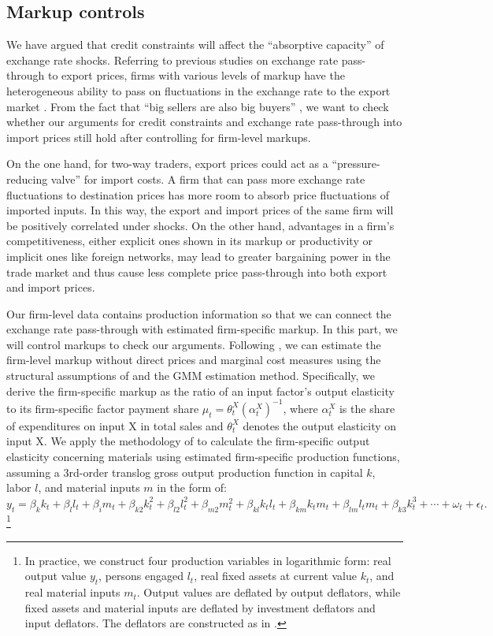 \subsection{Markup controls}

We have argued that credit constraints will affect the ``absorptive capacity'' of exchange rate shocks. Referring to previous studies on exchange rate pass-through to export prices, firms with various levels of markup have the heterogeneous ability to pass on fluctuations in the exchange rate to the export market \citep{aik2019}. From the fact that ``big sellers are also big buyers'' \citep{aik2014}, we want to check whether our arguments for credit constraints and exchange rate pass-through into import prices still hold after controlling for firm-level markups.

On the one hand, for two-way traders, export prices could act as a ``pressure-reducing valve'' for import costs. A firm that can pass more exchange rate fluctuations to destination prices has more room to absorb price fluctuations of imported inputs. In this way, the export and import prices of the same firm will be positively correlated under shocks. On the other hand, advantages in a firm's competitiveness, either explicit ones shown in its markup or productivity or implicit ones like foreign networks, may lead to greater bargaining power in the trade market and thus cause less complete price pass-through into both export and import prices.

Our firm-level data contains production information so that we can connect the exchange rate pass-through with estimated firm-specific markup. In this part, we will control markups to check our arguments. Following \cite{bkl2021}, we can estimate the firm-level markup without direct prices and marginal cost measures using the structural assumptions of \cite{dlw2012} and the GMM estimation method. Specifically, we derive the firm-specific markup as the ratio of an input factor's output elasticity to its firm-specific factor payment share $\mu_{t}=\theta_{t}^{X}\left(\alpha_{t}^{X}\right)^{-1}$, where $\alpha_{t}^{X}$ is the share of expenditures on input X in total sales and $\theta^X_t$ denotes the output elasticity on input X. We apply the methodology of \cite{acf2015} to calculate the firm-specific output elasticity concerning materials using estimated firm-specific production functions, assuming a 3rd-order translog gross output production function in capital $k$, labor $l$, and material inputs $m$ in the form of: $ y_{t}= \beta_{k} k_{t}+\beta_{l} l_{t}+\beta_{i} m_{t}+\beta_{k 2} k_{t}^{2}+\beta_{l 2} l_{t}^{2}+\beta_{m 2} m_{t}^{2}+ \beta_{k l} k_{ t} l_{t}+\beta_{k m} k_{t} m_{t}+\beta_{l m} l_{t} m_{t}+\beta_{k 3} k_{t}^{3}+\cdots+\omega_{t}+\epsilon_{t}.
$\footnote{In practice, we construct four production variables in logarithmic form: real output value $y_t$, persons engaged $l_t$, real fixed assets at current value $k_t$, and real material inputs $m_t$. Output values are deflated by output deflators, while fixed assets and material inputs are deflated by investment deflators and input deflators. The deflators are constructed as in \cite{brandt2012}.}

